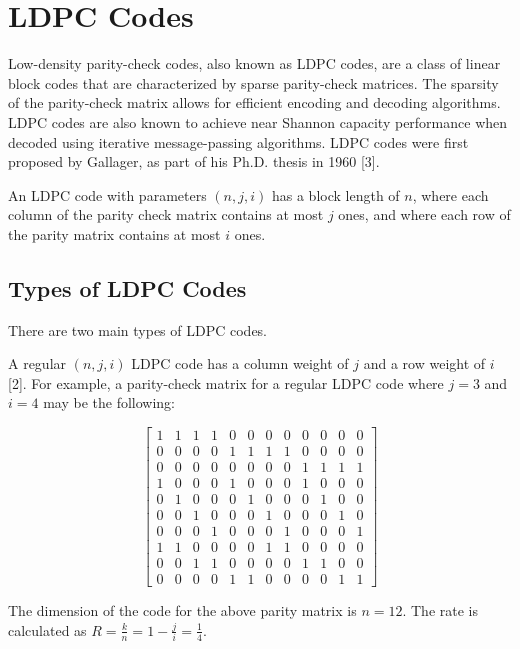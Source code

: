 \documentclass[conference]{IEEEtran}
\begin{document}
\section{LDPC Codes}
Low-density parity-check codes, also known as LDPC codes, are a class of linear block
codes that are characterized by sparse parity-check matrices. The sparsity of
the parity-check matrix allows for efficient encoding and decoding algorithms.
LDPC codes are also known to achieve near Shannon capacity performance when
decoded using iterative message-passing algorithms.
LDPC codes were first proposed by Gallager, as part of his Ph.D. thesis in 1960 [3].

An LDPC code with parameters $(n,j,i)$ has a block length of $n$, where each column of the parity check matrix contains at most $j$ ones, and where each row of the parity matrix contains at most $i$ ones.

\subsection{Types of LDPC Codes}
There are two main types of LDPC codes.

A regular $(n,j,i)$ LDPC code has a column weight of $j$ and a row weight of $i$ [2].
For example, a parity-check matrix for a regular LDPC code where $j=3$ and $i=4$ may be the following:

$$\begin{bmatrix}
    1 & 1 & 1 & 1 & 0 & 0 & 0 & 0 & 0 & 0 & 0 & 0 \\
    0 & 0 & 0 & 0 & 1 & 1 & 1 & 1 & 0 & 0 & 0 & 0 \\
    0 & 0 & 0 & 0 & 0 & 0 & 0 & 0 & 1 & 1 & 1 & 1 \\
    1 & 0 & 0 & 0 & 1 & 0 & 0 & 0 & 1 & 0 & 0 & 0 \\
    0 & 1 & 0 & 0 & 0 & 1 & 0 & 0 & 0 & 1 & 0 & 0 \\
    0 & 0 & 1 & 0 & 0 & 0 & 1 & 0 & 0 & 0 & 1 & 0 \\
    0 & 0 & 0 & 1 & 0 & 0 & 0 & 1 & 0 & 0 & 0 & 1 \\
    1 & 1 & 0 & 0 & 0 & 0 & 1 & 1 & 0 & 0 & 0 & 0 \\
    0 & 0 & 1 & 1 & 0 & 0 & 0 & 0 & 1 & 1 & 0 & 0 \\
    0 & 0 & 0 & 0 & 1 & 1 & 0 & 0 & 0 & 0 & 1 & 1
  \end{bmatrix}$$

The dimension of the code for the above parity matrix is $n=12$.
The rate is calculated as $R=\frac{k}{n}=1-\frac{j}{i}=\frac{1}{4}$.
\end{document}
